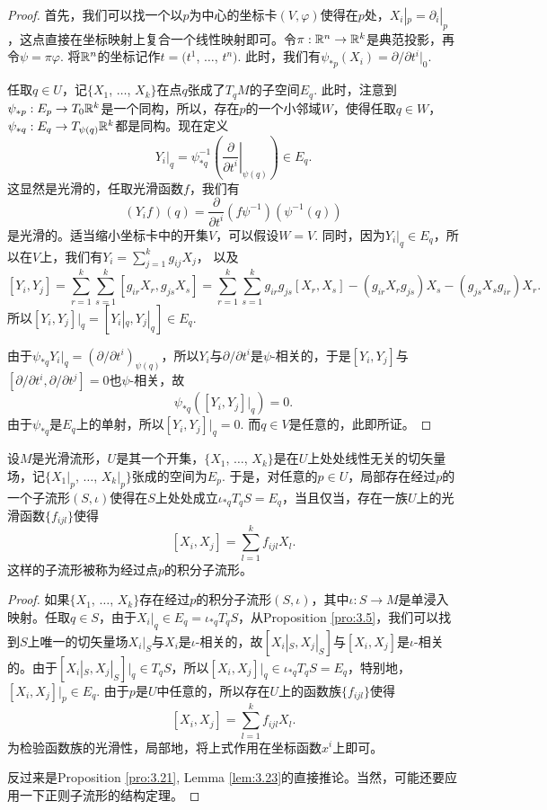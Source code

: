 \begin{proof}
首先，我们可以找一个以$p$为中心的坐标卡$(V,\varphi)$使得在$p$处，$X_i|_p=\partial_i|_p$，这点直接在坐标映射上复合一个线性映射即可。令$\pi:\mathbb{R}^n\to\mathbb{R}^k$是典范投影，再令$\psi=\pi \varphi$. 将$\mathbb{R}^n$的坐标记作$t=(t^1$, $\dots$, $t^n)$. 此时，我们有$\psi_{*p}(X_i)=\partial/\partial t^i|_{0}$.

任取$q\in U$，记$\{X_1$, $\dots$, $X_k\}$在点$q$张成了$T_q M$的子空间$E_q$. 此时，注意到$\psi_{*p}:E_p\to T_{0}\mathbb{R}^k$是一个同构，所以，存在$p$的一个小邻域$W$，使得任取$q\in W$，$\psi_{*q}:E_q\to T_{\psi(q)}\mathbb{R}^k$都是同构。现在定义
\[
	Y_i|_q=\psi_{*q}^{-1}\left(\left.\frac \partial{\partial t^i}\right|_{\psi(q)}\right)\in E_q.
\]
这显然是光滑的，任取光滑函数$f$，我们有
\[
	(Y_if)(q)=\frac \partial{\partial t^i}(f\psi^{-1})\left(\psi^{-1}(q)\right)
\]
是光滑的。适当缩小坐标卡中的开集$V$，可以假设$W=V$. 同时，因为$Y_i|_q\in E_q$，所以在$V$上，我们有$Y_i=\sum_{j=1}^k g_{ij}X_j$，
以及
\[
	[Y_i,Y_j]=\sum_{r=1}^k\sum_{s=1}^k [g_{ir}X_r,g_{js}X_s]=\sum_{r=1}^k\sum_{s=1}^k g_{ir}g_{js}[X_r,X_s]-(g_{ir}X_rg_{js})X_s-(g_{js}X_sg_{ir})X_r.
\]
所以$[Y_i,Y_j]|_q=[Y_i|_q,Y_j|_q]\in E_q$.

由于$\psi_{*q}Y_i|_q=(\partial/{\partial t^i})_{\psi(q)}$，所以$Y_i$与$\partial/{\partial t^i}$是$\psi$-相关的，于是$[Y_i, Y_j]$与$[\partial/{\partial t^i},\partial/{\partial t^j}]=0$也$\psi$-相关，故
\[
	\psi_{*q}([Y_i,Y_j]|_q)=0.
\]
由于$\psi_{*q}$是$E_q$上的单射，所以$[Y_i,Y_j]|_q=0$. 而$q\in V$是任意的，此即所证。
\end{proof}

\begin{thm}[局部Frobenius定理]
设$M$是光滑流形，$U$是其一个开集，$\{X_1$, $\dots$, $X_k\}$是在$U$上处处线性无关的切矢量场，记$\{X_1|_p$, $\dots$, $X_k|_p\}$张成的空间为$E_p$. 于是，对任意的$p\in U$，局部存在经过$p$的一个子流形$(S,\iota)$使得在$S$上处处成立$\iota_{*q}T_q S=E_q$，当且仅当，存在一族$U$上的光滑函数$\{f_{ijl}\}$使得
\[
	[X_i,X_j]=\sum_{l=1}^k f_{ijl}X_l.
\]
这样的子流形被称为经过点$p$的积分子流形。
\end{thm}

\begin{proof}
如果$\{X_1$, $\dots$, $X_k\}$存在经过$p$的积分子流形$(S,\iota)$，其中$\iota:S\to M$是单浸入映射。任取$q\in S$，由于$X_i|_q\in E_q=\iota_{*q}T_q S$，从Proposition \ref{pro:3.5}，我们可以找到$S$上唯一的切矢量场$X_i|_S$与$X_i$是$\iota$-相关的，故$[X_i|_S,X_j|_S]$与$[X_i,X_j]$是$\iota$-相关的。由于$[X_i|_S,X_j|_S]|_q\in T_qS$，所以$[X_i,X_j]|_q\in \iota_{*q}T_q S=E_q$，特别地，$[X_i,X_j]|_p\in E_q$. 由于$p$是$U$中任意的，所以存在$U$上的函数族$\{f_{ijl}\}$使得
\[
	[X_i,X_j]=\sum_{l=1}^k f_{ijl}X_l.
\]
为检验函数族的光滑性，局部地，将上式作用在坐标函数$x^i$上即可。

反过来是Proposition \ref{pro:3.21}, Lemma \ref{lem:3.23}的直接推论。当然，可能还要应用一下正则子流形的结构定理。
\end{proof}

